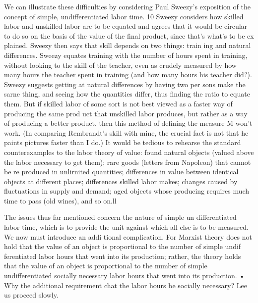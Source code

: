 \documentclass[11pt,openany]{book}
\begin{document}
We can illustrate these difficulties by considering Paul Sweezy's exposition of the concept of simple, undifferentiated labor time. 10 Sweezy considers how skilled labor and unskilled labor are to be equated and agrees that it would be circular to do so on the basis of the value of the final product, since that's what's to be ex plained. Sweezy then says that skill depends on two things: train ing and natural differences. Sweezy equates training with the number of hours spent in training, without looking to the skill of the teacher, even as crudely measured by how many hours the teacher spent in training (and how many hours his teacher did?). Sweezy suggests getting at natural differences by having two per sons make the sarne thing, and seeing how the quantities differ, thus finding the ratio to equate them. But if skilled labor of some sort is not best viewed as a faster way of producing the same prod uct that unskilled labor produces, but rather as a way of producing a better product, then this method of defining the measure M won't work. (In comparing Rembrandt's skill with mine, the crucial fact is not that he paints pictures faster than I do.) It would be tedious to rehearse the standard counterexamples to the labor theory of value: found natural objects (valued above the labor necessary to get them); rare goods (letters from Napoleon) that cannot be re produced in unlirnited quantities; differences in value between identical objects at different places; differences skilled labor makes; changes caused by fluctuations in supply and demand; aged objects whose producing requires much time to pass (old wines), and so on.ll 

The issues thus far mentioned concern the nature of simple un differentiated labor time, which is to provide the unit against which all else is to be measured. We now must introduce an addi tional complication. For Marxist theory does not hold that the value of an object is proportional to the number of simple undif ferentiated labor hours that went into its production; rather, the theory holds that the value of an object is proportional to the number of simple undifferentiated socially necessary labor hours that went into its production. • Why the additional requirement chat the labor hours be socially necessary? Lee us proceed slowly. 
\end{document}
